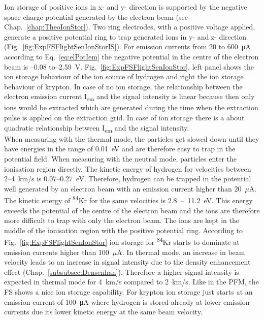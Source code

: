		Ion storage of positive ions in x- and y- direction is supported by the negative space charge potential generated by the electron beam (see Chap.~\ref{chap:TheoIonStor}). Two ring electrodes, with a positive voltage applied, generate a positive potential ring to trap generated ions in y- and z- direction (Fig.~\ref{fig:ExpFSFlightSenIonStorIS}). For emission currents from 20 to 600~\si{\micro\ampere} according to Eq.~\eqref{eq:elPotIem} the negative potential in the centre of the electron beam is --0.08 to--2.59~\si{\volt}. Fig.~\ref{fig:ExpFSFlightSenIonStor}, left panel shows the ion storage behaviour of the ion source of hydrogen and right the ion storage behaviour of krypton. In case of no ion storage, the relationship between the electron emission current I\textsubscript{em} and the signal intensity is linear because then only ions would be extracted which are generated during the time when the extraction pulse is applied on the extraction grid. In case of ion storage there is a about quadratic relationship between I\textsubscript{em} and the signal intensity.\\
		When measuring with the thermal mode, the particles get slowed down until they have energies in the range of 0.01~\si{\electronvolt} and are therefore easy to trap in the potential field. When measuring with the neutral mode, particles enter the ionisation region directly. The kinetic energy of hydrogen for velocities between 2--4~km/s is 0.07--0.27~eV. Therefore, hydrogen can be trapped in the potential well generated by an electron beam with an emission current higher than 20~$\mu$A.\\
		The kinetic energy of \textsuperscript{84}Kr for the same velocities is 2.8~--~11.2~eV. This energy exceeds the potential of the centre of the electron beam and the ions are therefore more difficult to trap with only the electron beam. The ions are kept in the middle of the ionisation region with the positive potential ring. According to Fig.~\ref{fig:ExpFSFlightSenIonStor} ion storage for \textsuperscript{84}Kr starts to dominate at emission currents higher than 100~$\mu$A. In thermal mode, an increase in beam velocity leads to an increase in signal intensity due to the density enhancement effect (Chap.~\ref{subsubsec:Densenhan}). Therefore a higher signal intensity is expected in thermal mode for 4~km/s compared to 2~km/s. Like in the PFM, the FS shows a nice ion storage capability. For krypton ion storage just starts at an emission current of 100~\si{\micro\ampere} where hydrogen is stored already at lower emission currents due its lower kinetic energy at the same beam velocity.\\

